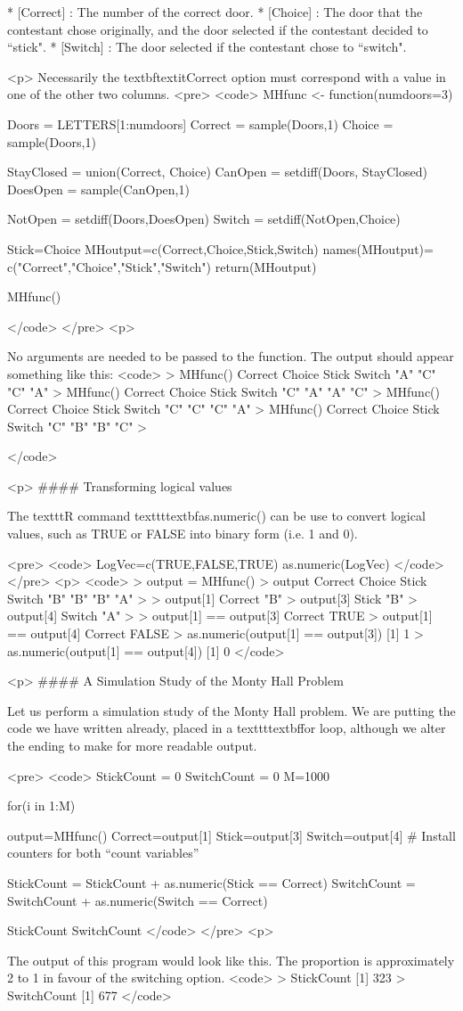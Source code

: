         * [Correct] : The number of the correct door.
        * [Choice] :  The door that the contestant chose originally, and the door selected if the contestant decided to ``stick".
        * [Switch] : The door selected if the contestant chose to ``switch".


<p>
Necessarily the textbf{textit{Correct}} option must correspond with a value in one of the other two columns.
<pre>
<code>
MHfunc <- function(numdoors=3){
 Doors = LETTERS[1:numdoors]
 Correct = sample(Doors,1)
 Choice = sample(Doors,1)
 
 StayClosed = union(Correct, Choice)
 CanOpen = setdiff(Doors, StayClosed)
 DoesOpen = sample(CanOpen,1)
 
 NotOpen = setdiff(Doors,DoesOpen)
 Switch = setdiff(NotOpen,Choice)

 Stick=Choice 
 MHoutput=c(Correct,Choice,Stick,Switch)
 names(MHoutput)= c("Correct","Choice","Stick","Switch")
 return(MHoutput)
}
MHfunc()

</code> 
</pre>
<p>

No arguments are needed to be passed to the function. The output should appear something like this:
<code>
> MHfunc()
Correct  Choice   Stick  Switch 
"A"     "C"     "C"     "A" 
> MHfunc()
Correct  Choice   Stick  Switch 
"C"     "A"     "A"     "C" 
> MHfunc()
Correct  Choice   Stick  Switch 
"C"     "C"     "C"     "A" 
> MHfunc()
Correct  Choice   Stick  Switch 
"C"     "B"     "B"     "C" 
> 

</code>

<p>
#### {Transforming logical values}

The texttt{R} command texttt{textbf{as.numeric()}} can be use to convert logical values, such as TRUE or FALSE into binary form (i.e. 1 and 0).

<pre>
<code>
LogVec=c(TRUE,FALSE,TRUE)
as.numeric(LogVec)
</code> 
</pre>
<p>
<code>
> output = MHfunc()
> output
Correct  Choice   Stick  Switch 
"B"     "B"     "B"     "A" 
> 
> output[1]
Correct 
"B" 
> output[3]
Stick 
"B" 
> output[4]
Switch 
"A" 
> 
> output[1] == output[3]
Correct 
TRUE 
> output[1] == output[4]
Correct 
FALSE 
> as.numeric(output[1] == output[3])
[1] 1
> as.numeric(output[1] == output[4])
[1] 0
</code>

<p>
#### {A Simulation Study of the Monty Hall Problem}

Let us perform a simulation study of the Monty Hall problem. We are putting the code we have written already, placed in a texttt{textbf{for}} loop, although we alter the ending to make for more readable output.

<pre>
<code>
StickCount = 0
SwitchCount = 0
M=1000

for(i in 1:M)
 {
 output=MHfunc()
 Correct=output[1]
 Stick=output[3]
 Switch=output[4]
 # Install counters for both “count variables”

 StickCount = StickCount + as.numeric(Stick  ==  Correct)
 SwitchCount = SwitchCount + as.numeric(Switch  ==  Correct)
}
StickCount
SwitchCount
</code> 
</pre>
<p>

The output of this program would look like this. The proportion is approximately 2 to 1 in favour of the switching option.
<code>
> StickCount
[1] 323
> SwitchCount
[1] 677
</code>

